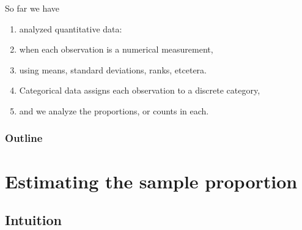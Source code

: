 %
%
%



\subtitle{with confidence}

\date{2 April 2015}




\begin{frame}
  \maketitle
\end{frame}


\begin{frame}{So far we have}
  \begin{enumerate}
    \item analyzed \alert{quantitative} data:
    \item when each observation is a numerical measurement,
    \item using means, standard deviations, ranks, etcetera.
    \item \alert{Categorical data} assigns each observation to a discrete category,
    \item and we analyze the proportions, or counts in each.
  \end{enumerate}
\end{frame}

\begin{frame}\frametitle<presentation>{Outline}
  \tableofcontents
\end{frame}



\section{Estimating the sample proportion}
\subsection{Intuition}

